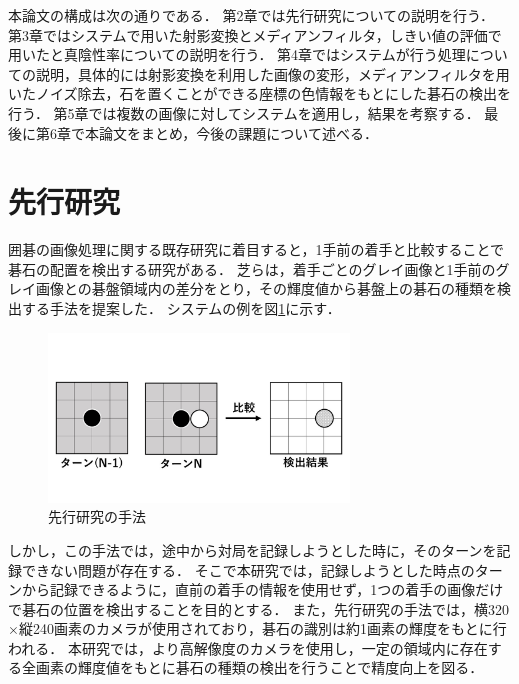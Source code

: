 \documentclass[openright]{nitocs}
\numberwithin{equation}{section}
\begin{document}
        本論文の構成は次の通りである．
        第2章では先行研究についての説明を行う．
        第3章ではシステムで用いた射影変換とメディアンフィルタ，しきい値の評価で用いたと真陰性率についての説明を行う．
        第4章ではシステムが行う処理についての説明，具体的には射影変換を利用した画像の変形，メディアンフィルタを用いたノイズ除去，石を置くことができる座標の色情報をもとにした碁石の検出を行う．
        第5章では複数の画像に対してシステムを適用し，結果を考察する．
        最後に第6章で本論文をまとめ，今後の課題について述べる．

    \section{先行研究} %
        囲碁の画像処理に関する既存研究に着目すると，1手前の着手と比較することで碁石の配置を検出する研究がある．
        芝らは，着手ごとのグレイ画像と1手前のグレイ画像との碁盤領域内の差分をとり，その輝度値から碁盤上の碁石の種類を検出する手法を提案した\cite{PilotStudy}．
        システムの例を図\ref{PS_img}に示す．
        \begin{figure}[tb] %
            \begin{center}
            \includegraphics[clip,width=80mm]{PilotStudy_image.jpg} 
            \caption{先行研究の手法}
            \label{PS_img}
            \end{center}
        \end{figure}

        しかし，この手法では，途中から対局を記録しようとした時に，そのターンを記録できない問題が存在する．
        そこで本研究では，記録しようとした時点のターンから記録できるように，直前の着手の情報を使用せず，1つの着手の画像だけで碁石の位置を検出することを目的とする．
        また，先行研究の手法では，横320$\times$縦240画素のカメラが使用されており，碁石の識別は約1画素の輝度をもとに行われる．
        本研究では，より高解像度のカメラを使用し，一定の領域内に存在する全画素の輝度値をもとに碁石の種類の検出を行うことで精度向上を図る．
\end{document}

